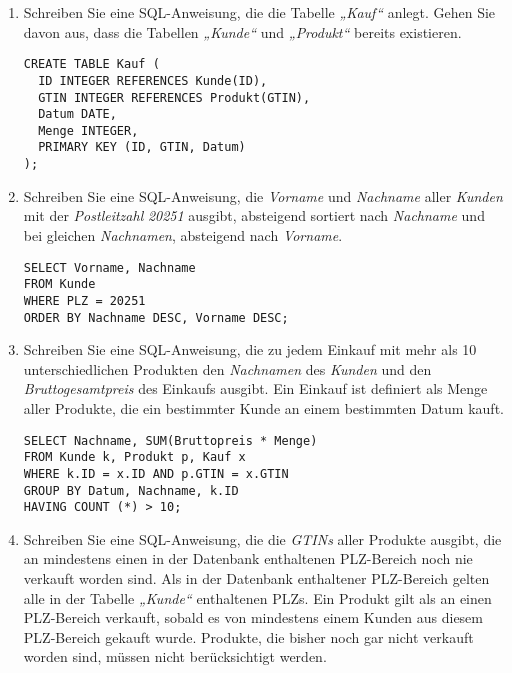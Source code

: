 \documentclass{lehramt-informatik-aufgabe}
\begin{document}
\begin{enumerate}


\item Schreiben Sie eine SQL-Anweisung, die die Tabelle \emph{„Kauf“}
anlegt. Gehen Sie davon aus, dass die Tabellen \emph{„Kunde“} und
\emph{„Produkt“} bereits existieren.

\begin{antwort}[muster]
\begin{verbatim}
CREATE TABLE Kauf (
  ID INTEGER REFERENCES Kunde(ID),
  GTIN INTEGER REFERENCES Produkt(GTIN),
  Datum DATE,
  Menge INTEGER,
  PRIMARY KEY (ID, GTIN, Datum)
);
\end{verbatim}
\end{antwort}


\item Schreiben Sie eine SQL-Anweisung, die \emph{Vorname} und
\emph{Nachname} aller \emph{Kunden} mit der \emph{Postleitzahl}
\emph{20251} ausgibt, absteigend sortiert nach \emph{Nachname} und bei
gleichen \emph{Nachnamen}, absteigend nach \emph{Vorname}.

\begin{antwort}[muster]
\begin{verbatim}
SELECT Vorname, Nachname
FROM Kunde
WHERE PLZ = 20251
ORDER BY Nachname DESC, Vorname DESC;
\end{verbatim}
\end{antwort}


\item Schreiben Sie eine SQL-Anweisung, die zu jedem Einkauf mit mehr
als 10 unterschiedlichen Produkten den \emph{Nachnamen} des
\emph{Kunden} und den \emph{Bruttogesamtpreis} des Einkaufs ausgibt. Ein
Einkauf ist definiert als Menge aller Produkte, die ein bestimmter Kunde
an einem bestimmten Datum kauft.

\begin{antwort}[muster]
\begin{verbatim}
SELECT Nachname, SUM(Bruttopreis * Menge)
FROM Kunde k, Produkt p, Kauf x
WHERE k.ID = x.ID AND p.GTIN = x.GTIN
GROUP BY Datum, Nachname, k.ID
HAVING COUNT (*) > 10;
\end{verbatim}
\end{antwort}


\item Schreiben Sie eine SQL-Anweisung, die die \emph{GTINs} aller
Produkte ausgibt, die an mindestens einen in der Datenbank enthaltenen
PLZ-Bereich noch nie verkauft worden sind. Als in der Datenbank
enthaltener PLZ-Bereich gelten alle in der Tabelle \emph{„Kunde“}
enthaltenen PLZs. Ein Produkt gilt als an einen PLZ-Bereich verkauft,
sobald es von mindestens einem Kunden aus diesem PLZ-Bereich gekauft
wurde. Produkte, die bisher noch gar nicht verkauft worden sind, müssen
nicht berücksichtigt werden.


\end{enumerate}
\end{document}
